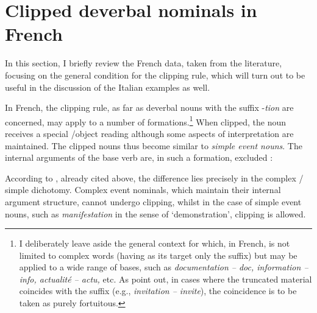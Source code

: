 \documentclass[output=paper]{langsci/langscibook}
\begin{document}
\section{Clipped deverbal nominals in
French}\label{Stekauer-clipped-deverbal-nominals-in-french}

In this section, I  briefly review the French data, taken from the
literature, focusing on the general condition for the clipping rule,
which will turn out to be useful  in the discussion of the Italian
examples as well.

In French, the clipping rule, as far as deverbal nouns with the suffix
-\emph{tion} are concerned, may apply to a number of formations.\footnote{I deliberately leave aside the general context for 
  which, in French, is not limited to complex words (having as its
  target only the suffix) but may be applied to a wide range of bases,
  such as \emph{documentation -- doc, information -- info, actualité --
  actu,} etc. As %
\citet[183]{MonterminiThornton2014} %
%
point out, in cases
  where the truncated material coincides with the suffix (e.g.,
  \emph{invitation -- invite}), the coincidence is to be taken as purely
  fortuitous.} When clipped, the noun receives a special /object
reading although some aspects of  interpretation are maintained.
The clipped nouns thus become similar to \emph{simple event nouns}. The
internal arguments of the base verb are, in such a formation, excluded
%
\citep[see][171]{Kerleroux1997}%
%
:

\begin{exe}
\ex\label{ex:Stekauer:6}
\begin{xlist}
\end{xlist}
\end{exe}

According to %
\citet[155]{Kerleroux1997}%
%
, already cited  above, the difference
lies precisely in the complex / simple  dichotomy. Complex
event nominals, which maintain their internal argument structure, cannot
undergo clipping, whilst in the case of simple event nouns, such as
\emph{manifestation} in the sense of `demonstration', clipping is
allowed.
\end{document}
